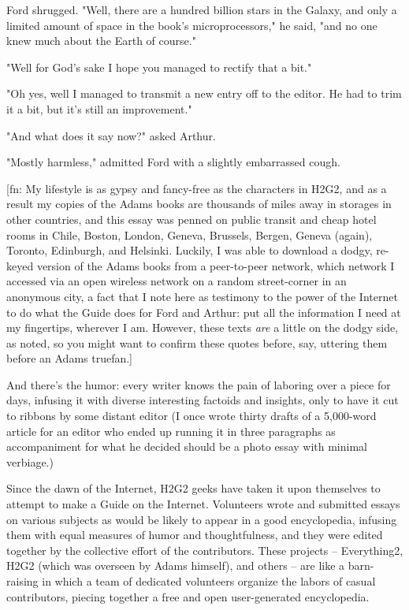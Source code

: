 Ford shrugged. "Well, there are a hundred billion stars in the
Galaxy, and only a limited amount of space in the book's
microprocessors," he said, "and no one knew much about the Earth of
course."

"Well for God's sake I hope you managed to rectify that a bit."

"Oh yes, well I managed to transmit a new entry off to the editor.
He had to trim it a bit, but it's still an improvement."

"And what does it say now?" asked Arthur.

"Mostly harmless," admitted Ford with a slightly embarrassed
cough.

[fn: My lifestyle is as gypsy and fancy-free as the characters in
H2G2, and as a result my copies of the Adams books are thousands of
miles away in storages in other countries, and this essay was
penned on public transit and cheap hotel rooms in Chile, Boston,
London, Geneva, Brussels, Bergen, Geneva (again), Toronto,
Edinburgh, and Helsinki. Luckily, I was able to download a dodgy,
re-keyed version of the Adams books from a peer-to-peer network,
which network I accessed via an open wireless network on a random
street-corner in an anonymous city, a fact that I note here as
testimony to the power of the Internet to do what the Guide does
for Ford and Arthur: put all the information I need at my
fingertips, wherever I am. However, these texts \emph{are} a
little on the dodgy side, as noted, so you might want to confirm
these quotes before, say, uttering them before an Adams truefan.]

And there's the humor: every writer knows the pain of laboring over
a piece for days, infusing it with diverse interesting factoids and
insights, only to have it cut to ribbons by some distant editor (I
once wrote thirty drafts of a 5,000-word article for an editor who
ended up running it in three paragraphs as accompaniment for what
he decided should be a photo essay with minimal verbiage.)

Since the dawn of the Internet, H2G2 geeks have taken it upon
themselves to attempt to make a Guide on the Internet. Volunteers
wrote and submitted essays on various subjects as would be likely
to appear in a good encyclopedia, infusing them with equal measures
of humor and thoughtfulness, and they were edited together by the
collective effort of the contributors. These projects --
Everything2, H2G2 (which was overseen by Adams himself), and others
-- are like a barn-raising in which a team of dedicated volunteers
organize the labors of casual contributors, piecing together a free
and open user-generated encyclopedia.

